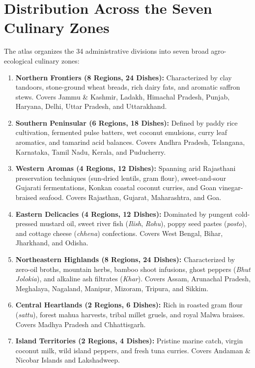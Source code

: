 \documentclass[11pt,a4paper]{report}
\begin{document}
\section{Distribution Across the Seven Culinary Zones}
The atlas organizes the 34 administrative divisions into seven broad agro-ecological culinary zones:
\begin{enumerate}
    \item \textbf{Northern Frontiers (8 Regions, 24 Dishes):} Characterized by clay tandoors, stone-ground wheat breads, rich dairy fats, and aromatic saffron stews. Covers Jammu \& Kashmir, Ladakh, Himachal Pradesh, Punjab, Haryana, Delhi, Uttar Pradesh, and Uttarakhand.
    \item \textbf{Southern Peninsular (6 Regions, 18 Dishes):} Defined by paddy rice cultivation, fermented pulse batters, wet coconut emulsions, curry leaf aromatics, and tamarind acid balances. Covers Andhra Pradesh, Telangana, Karnataka, Tamil Nadu, Kerala, and Puducherry.
    \item \textbf{Western Aromas (4 Regions, 12 Dishes):} Spanning arid Rajasthani preservation techniques (sun-dried lentils, gram flour), sweet-and-sour Gujarati fermentations, Konkan coastal coconut curries, and Goan vinegar-braised seafood. Covers Rajasthan, Gujarat, Maharashtra, and Goa.
    \item \textbf{Eastern Delicacies (4 Regions, 12 Dishes):} Dominated by pungent cold-pressed mustard oil, sweet river fish (\emph{Ilish}, \emph{Rohu}), poppy seed pastes (\emph{posto}), and cottage cheese (\emph{chhena}) confections. Covers West Bengal, Bihar, Jharkhand, and Odisha.
    \item \textbf{Northeastern Highlands (8 Regions, 24 Dishes):} Characterized by zero-oil broths, mountain herbs, bamboo shoot infusions, ghost peppers (\emph{Bhut Jolokia}), and alkaline ash filtrates (\emph{Khar}). Covers Assam, Arunachal Pradesh, Meghalaya, Nagaland, Manipur, Mizoram, Tripura, and Sikkim.
    \item \textbf{Central Heartlands (2 Regions, 6 Dishes):} Rich in roasted gram flour (\emph{sattu}), forest mahua harvests, tribal millet gruels, and royal Malwa braises. Covers Madhya Pradesh and Chhattisgarh.
    \item \textbf{Island Territories (2 Regions, 4 Dishes):} Pristine marine catch, virgin coconut milk, wild island peppers, and fresh tuna curries. Covers Andaman \& Nicobar Islands and Lakshadweep.
\end{enumerate}
\end{document}
